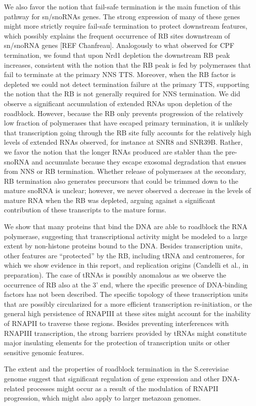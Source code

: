 We also favor the notion that fail-safe termination is the main function of this pathway for sn/snoRNAs genes. The strong expression of many of these genes might more strictly require fail-safe termination to protect downstream features, which possibly explains the frequent occurrence of RB sites downstream of sn/snoRNA genes [REF Chanfreau]. Analogously to what observed for CPF termination, we found that upon Nrd1 depletion the downstream RB peak increases, consistent with the notion that the RB peak is fed by polymerases that fail to terminate at the primary NNS TTS. Moreover, when the RB factor is depleted we could not detect termination failure at the primary TTS, supporting the notion that the RB is not generally required for NNS termination. We did observe a significant accumulation of extended RNAs upon depletion of the roadblock. However, because the RB only prevents progression of the relatively low fraction of polymerases that have escaped primary termination, it is unlikely that transcription going through the RB site fully accounts for the relatively high levels of extended RNAs observed, for instance at SNR8 and SNR39B. Rather, we favor the notion that the longer RNAs produced are stabler than the pre-snoRNA and accumulate because they escape exosomal degradation that ensues from NNS or RB termination. Whether release of polymerases at the secondary, RB termination also generates precursors that could be trimmed down to the mature snoRNA is unclear; however, we never observed a decrease in the levels of mature RNA when the RB was depleted, arguing against a significant contribution of these transcripts to the mature forms. 

We show that many proteins that bind the DNA are able to roadblock the RNA polymerase, suggesting that transcriptional activity might be modeled to a large extent by non-histone proteins bound to the DNA. Besides transcription units, other features are “protected” by the RB, including tRNA and centromeres, for which we show evidence in this report, and replication origins (Candelli et al., in preparation). The case of tRNAs is possibly anomalous as we observe the occurrence of RB also at the 3’ end, where the specific presence of DNA-binding factors has not been described. The specific topology of these transcription units that are possibly circularized for a more efficient transcription re-initiation, or the general high persistence of RNAPIII at these sites might account for the inability of RNAPII to traverse these regions. Besides preventing interferences with RNAPIII transcription, the strong barriers provided by tRNAs might constitute major insulating elements for the protection of transcription units or other sensitive genomic features. 

The extent and the properties of roadblock termination in the S.cerevisiae genome suggest that significant regulation of gene expression and other DNA-related processes might occur as a result of the modulation of RNAPII progression, which might also apply to larger metazoan genomes. 
